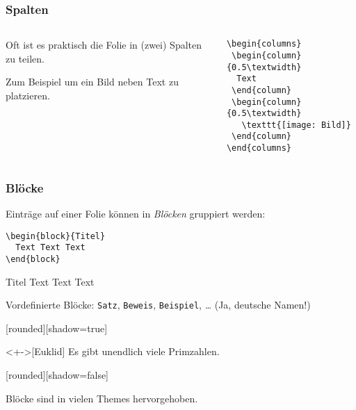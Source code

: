 \begin{slide}
  \frametitle{Spalten}
  \begin{columns}
    \begin{column}{0.4\textwidth}
      Oft ist es praktisch die Folie in (zwei) Spalten zu teilen.

      Zum Beispiel um ein Bild neben Text zu platzieren.
    \end{column}
    \begin{column}{0.6\textwidth}
\begin{lstlisting}
\begin{columns}
 \begin{column}{0.5\textwidth}
  Text
 \end{column}
 \begin{column}{0.5\textwidth}
   \texttt{[image: Bild]}
 \end{column}
\end{columns}
\end{lstlisting}
    \end{column}
  \end{columns}
\end{slide}

\begin{slide}
  \frametitle{Blöcke}

  \onslide<+->

  Einträge auf einer Folie können in \emph{Blöcken} gruppiert werden:

\begin{lstlisting}
\begin{block}{Titel}
  Text Text Text
\end{block}
\end{lstlisting}

  \onslide<+->

  \begin{block}{Titel}
    Text Text Text
  \end{block}

  \onslide<+->

  Vordefinierte Blöcke: \texttt{Satz}, \texttt{Beweis}, \texttt{Beispiel}, \dots{} (Ja, deutsche Namen!)


  [rounded][shadow=true]
  \begin{Satz}<+->[Euklid]
    Es gibt unendlich viele Primzahlen.
  \end{Satz}
  [rounded][shadow=false]

  \onslide<+->
  Blöcke sind in vielen Themes hervorgehoben.
\end{slide}

